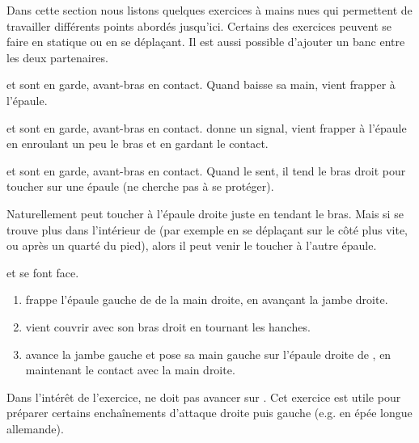 Dans cette section nous listons quelques exercices à mains nues qui permettent de travailler différents points abordés jusqu'ici.
Certains des exercices peuvent se faire en statique ou en se déplaçant.
Il est aussi possible d'ajouter un banc entre les deux partenaires.


\begin{exercice}
	\label{struct:ex:contact:frappe-signal}

	\A et \D sont en garde, avant-bras en contact.
	Quand \A baisse sa main, \D vient frapper à l'épaule.

\end{exercice}


\begin{exercice}
	\A et \D sont en garde, avant-bras en contact.
	\A donne un signal, \D vient frapper à l'épaule en enroulant un peu le bras et en gardant le contact.

\end{exercice}


\begin{exercice}
	\label{struct:ex:contact:frappe-épaules}

	\A et \D sont en garde, avant-bras en contact.
	Quand \A le sent, il tend le bras droit pour toucher \D sur une épaule (\D ne cherche pas à se protéger).

	Naturellement \A peut toucher \D à l'épaule droite juste en tendant le bras.
	Mais si \A se trouve plus dans l'intérieur de \D (par exemple en se déplaçant sur le côté plus vite, ou après un quarté du pied), alors il peut venir le toucher à l'autre épaule.
\end{exercice}


\begin{exercice}
	\label{struct:ex:frappe-gauche-droite}

	\A et \D se font face.

	\begin{enumerate}
		\item \A frappe l'épaule gauche de \D de la main droite, en avançant la jambe droite.
		\item \D vient couvrir avec son bras droit en tournant les hanches.
		\item \A avance la jambe gauche et pose sa main gauche sur l'épaule droite de \D, en maintenant le contact avec la main droite.
	\end{enumerate}

	Dans l'intérêt de l'exercice, \D ne doit pas avancer sur \A.
	Cet exercice est utile pour préparer certains enchaînements d'attaque droite puis gauche (e.g.
	en épée longue allemande).
\end{exercice}


